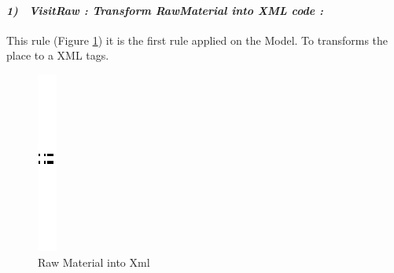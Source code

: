 \paragraph{\emph{1)~ VisitRaw : Transform RawMaterial into XML code :} }
This rule (Figure \ref{fig:Raw Material into Xml}) it is the first rule applied on the Model. To transforms the place to a XML
tags.
\begin{figure}[th]
\centering

\quad{}
\includegraphics{ch3/img/sep}
\quad{}
 
 
\caption{\label{fig:Raw Material into Xml}Raw Material into Xml} 

\end{figure} 

